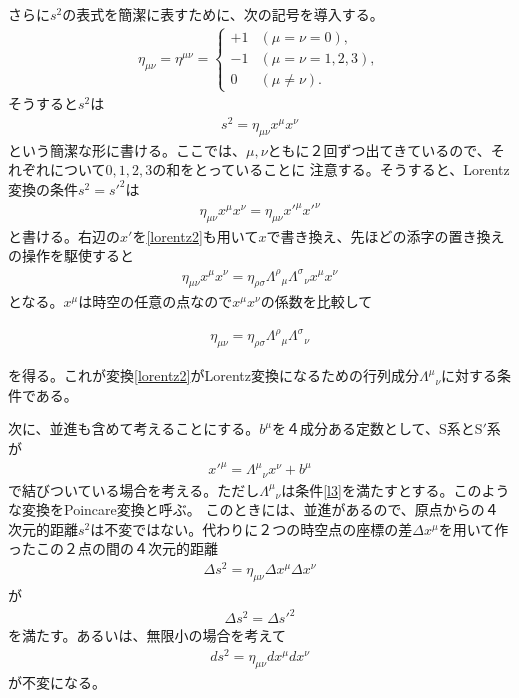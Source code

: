 \documentclass[report,paper=a4, fontsize=12pt, line_length=16cm, number_of_lines=33,dvipdfmx]{jlreq}
\newenvironment{important}{\begin{tcolorbox}[
  colback = white,
  colframe = red!35,
  boxrule = 2mm,
  fonttitle = \bfseries,
  after = \noindent] }{\end{tcolorbox}}
\numberwithin{equation}{chapter}
\newcommand{\Sp}{S$'$}
\begin{document}
さらに$s^{2}$の表式を簡潔に表すために、次の記号を導入する。
\begin{align}
\eta_{\mu\nu}=\eta^{\mu\nu}
=
\begin{cases}
+1&(\mu=\nu=0),\\
-1&(\mu=\nu=1,2,3),\\
0 &(\mu\ne\nu).
\end{cases}
\end{align}
そうすると$s^{2}$は
\begin{align}
s^{2}=
\eta_{\mu\nu}x^{\mu}x^{\nu}
\end{align}
という簡潔な形に書ける。ここでは、$\mu,\nu$ともに２回ずつ出てきているので、それぞれについて$0,1,2,3$の和をとっていることに
注意する。そうすると、Lorentz変換の条件$s^{2}=s'^{2}$は
\begin{align}
\eta_{\mu\nu}x^{\mu}x^{\nu}
=\eta_{\mu\nu}x'^{\mu}x'^{\nu}
\end{align}
と書ける。右辺の$x'$を\eqref{lorentz2}も用いて$x$で書き換え、先ほどの添字の置き換えの操作を駆使すると
\begin{align}
\eta_{\mu\nu}x^{\mu}x^{\nu}
=\eta_{\rho\sigma}\Lambda^{\rho}{}_{\mu}\Lambda^{\sigma}{}_{\nu}x^{\mu}x^{\nu}
\end{align}
となる。$x^{\mu}$は時空の任意の点なので$x^{\mu}x^{\nu}$の係数を比較して
\begin{important}
\begin{align}
\eta_{\mu\nu}
=\eta_{\rho\sigma}\Lambda^{\rho}{}_{\mu}\Lambda^{\sigma}{}_{\nu}
\label{l3}
\end{align}
\end{important}
を得る。これが変換\eqref{lorentz2}がLorentz変換になるための行列成分$\Lambda^{\mu}{}_{\nu}$に対する条件である。

次に、並進も含めて考えることにする。$b^{\mu}$を４成分ある定数として、S系と\Sp 系が
\begin{align}
x'^{\mu}=\Lambda^{\mu}{}_{\nu}x^{\nu}+b^{\mu}
\end{align}
で結びついている場合を考える。ただし$\Lambda^{\mu}{}_{\nu}$は条件\eqref{l3}を満たすとする。このような変換をPoincare変換と呼ぶ。
このときには、並進があるので、原点からの４次元的距離$s^{2}$は不変ではない。代わりに２つの時空点の座標の差$\Delta x^{\mu}$を用いて作ったこの２点の間の４次元的距離
\begin{align}
\Delta s^{2}=\eta_{\mu\nu}\Delta x^{\mu} \Delta x^{\nu}
\end{align}
が
\begin{align}
\Delta s^{2}=\Delta s'^{2}
\end{align}
を満たす。あるいは、無限小の場合を考えて
\begin{align}
ds^{2}=\eta_{\mu\nu}dx^{\mu}dx^{\nu}
\end{align}
が不変になる。
\end{document}
